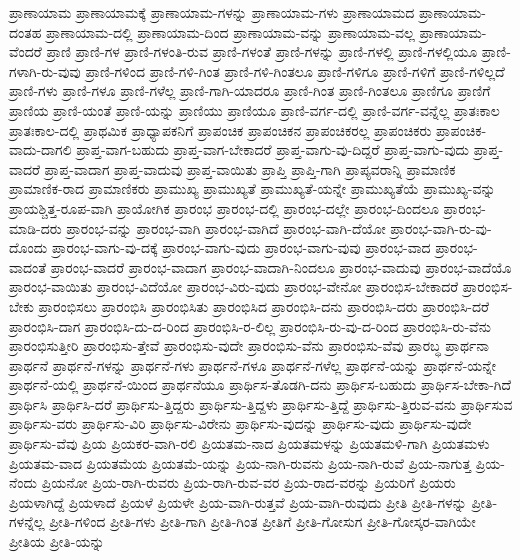 {ಪ್ರಾಣಾಯಾಮ
ಪ್ರಾಣಾಯಾಮಕ್ಕೆ
ಪ್ರಾಣಾಯಾಮ-ಗಳನ್ನು
ಪ್ರಾಣಾಯಾಮ-ಗಳು
ಪ್ರಾಣಾಯಾಮದ
ಪ್ರಾಣಾಯಾಮ-ದಂತಹ
ಪ್ರಾಣಾಯಾಮ-ದಲ್ಲಿ
ಪ್ರಾಣಾಯಾಮ-ದಿಂದ
ಪ್ರಾಣಾಯಾಮ-ವನ್ನು
ಪ್ರಾಣಾಯಾಮ-ವಲ್ಲ
ಪ್ರಾಣಾಯಾಮ-ವೆಂದರೆ
ಪ್ರಾಣಿ
ಪ್ರಾಣಿ-ಗಳ
ಪ್ರಾಣಿ-ಗಳಂತಿ-ರುವ
ಪ್ರಾಣಿ-ಗಳಂತೆ
ಪ್ರಾಣಿ-ಗಳನ್ನು
ಪ್ರಾಣಿ-ಗಳಲ್ಲಿ
ಪ್ರಾಣಿ-ಗಳಲ್ಲಿಯೂ
ಪ್ರಾಣಿ-ಗಳಾಗಿ-ರು-ವುವು
ಪ್ರಾಣಿ-ಗಳಿಂದ
ಪ್ರಾಣಿ-ಗಳಿ-ಗಿಂತ
ಪ್ರಾಣಿ-ಗಳಿ-ಗಿಂತಲೂ
ಪ್ರಾಣಿ-ಗಳಿಗೂ
ಪ್ರಾಣಿ-ಗಳಿಗೆ
ಪ್ರಾಣಿ-ಗಳಿಲ್ಲದೆ
ಪ್ರಾಣಿ-ಗಳು
ಪ್ರಾಣಿ-ಗಳೂ
ಪ್ರಾಣಿ-ಗಳೆಲ್ಲ
ಪ್ರಾಣಿ-ಗಾಗಿ-ಯಾದರೂ
ಪ್ರಾಣಿ-ಗಿಂತ
ಪ್ರಾಣಿ-ಗಿಂತಲೂ
ಪ್ರಾಣಿಗೂ
ಪ್ರಾಣಿಗೆ
ಪ್ರಾಣಿಯ
ಪ್ರಾಣಿ-ಯಂತೆ
ಪ್ರಾಣಿ-ಯನ್ನು
ಪ್ರಾಣಿಯು
ಪ್ರಾಣಿಯೂ
ಪ್ರಾಣಿ-ವರ್ಗ-ದಲ್ಲಿ
ಪ್ರಾಣಿ-ವರ್ಗ-ವನ್ನೆಲ್ಲ
ಪ್ರಾತಃಕಾಲ
ಪ್ರಾತಃಕಾಲ-ದಲ್ಲಿ
ಪ್ರಾಥಮಿಕ
ಪ್ರಾಧ್ಯಾಪಕನಿಗೆ
ಪ್ರಾಪಂಚಿಕ
ಪ್ರಾಪಂಚಿಕನ
ಪ್ರಾಪಂಚಿಕರಲ್ಲ
ಪ್ರಾಪಂಚಿಕರು
ಪ್ರಾಪಂಚಿಕ-ವಾದು-ದಾಗಲಿ
ಪ್ರಾಪ್ತ-ವಾಗ-ಬಹುದು
ಪ್ರಾಪ್ತ-ವಾಗ-ಬೇಕಾದರೆ
ಪ್ರಾಪ್ತ-ವಾಗು-ವು-ದಿದ್ದರೆ
ಪ್ರಾಪ್ತ-ವಾಗು-ವುದು
ಪ್ರಾಪ್ತ-ವಾದರೆ
ಪ್ರಾಪ್ತ-ವಾದಾಗ
ಪ್ರಾಪ್ತ-ವಾದುವು
ಪ್ರಾಪ್ತ-ವಾಯಿತು
ಪ್ರಾಪ್ತಿ
ಪ್ರಾಪ್ತಿ-ಗಾಗಿ
ಪ್ರಾಪ್ಯವರಾನ್ನಿ
ಪ್ರಾಮಾಣಿಕ
ಪ್ರಾಮಾಣಿಕ-ರಾದ
ಪ್ರಾಮಾಣಿಕರು
ಪ್ರಾಮುಖ್ಯ
ಪ್ರಾಮುಖ್ಯತೆ
ಪ್ರಾಮುಖ್ಯತೆ-ಯನ್ನೇ
ಪ್ರಾಮುಖ್ಯತೆಯೆ
ಪ್ರಾಮುಖ್ಯ-ವನ್ನು
ಪ್ರಾಯಶ್ಚಿತ್ತ-ರೂಪ-ವಾಗಿ
ಪ್ರಾಯೋಗಿಕ
ಪ್ರಾರಂಭ
ಪ್ರಾರಂಭ-ದಲ್ಲಿ
ಪ್ರಾರಂಭ-ದಲ್ಲೇ
ಪ್ರಾರಂಭ-ದಿಂದಲೂ
ಪ್ರಾರಂಭ-ಮಾಡಿ-ದರು
ಪ್ರಾರಂಭ-ವನ್ನು
ಪ್ರಾರಂಭ-ವಾಗಿ
ಪ್ರಾರಂಭ-ವಾಗಿದೆ
ಪ್ರಾರಂಭ-ವಾಗಿ-ದೆಯೋ
ಪ್ರಾರಂಭ-ವಾಗಿ-ರು-ವು-ದೊಂದು
ಪ್ರಾರಂಭ-ವಾಗು-ವು-ದಕ್ಕೆ
ಪ್ರಾರಂಭ-ವಾಗು-ವುದು
ಪ್ರಾರಂಭ-ವಾಗು-ವುವು
ಪ್ರಾರಂಭ-ವಾದ
ಪ್ರಾರಂಭ-ವಾದಂತೆ
ಪ್ರಾರಂಭ-ವಾದರೆ
ಪ್ರಾರಂಭ-ವಾದಾಗ
ಪ್ರಾರಂಭ-ವಾದಾಗಿ-ನಿಂದಲೂ
ಪ್ರಾರಂಭ-ವಾದುವು
ಪ್ರಾರಂಭ-ವಾದೆಯೊ
ಪ್ರಾರಂಭ-ವಾಯಿತು
ಪ್ರಾರಂಭ-ವಿದೆಯೋ
ಪ್ರಾರಂಭ-ವಿರು-ವುದು
ಪ್ರಾರಂಭ-ವೇನೋ
ಪ್ರಾರಂಭಿಸ-ಬೇಕಾದರೆ
ಪ್ರಾರಂಭಿಸ-ಬೇಕು
ಪ್ರಾರಂಭಿಸಲು
ಪ್ರಾರಂಭಿಸಿ
ಪ್ರಾರಂಭಿಸಿತು
ಪ್ರಾರಂಭಿಸಿದ
ಪ್ರಾರಂಭಿಸಿ-ದನು
ಪ್ರಾರಂಭಿಸಿ-ದರು
ಪ್ರಾರಂಭಿಸಿ-ದರೆ
ಪ್ರಾರಂಭಿಸಿ-ದಾಗ
ಪ್ರಾರಂಭಿಸಿ-ದು-ದ-ರಿಂದ
ಪ್ರಾರಂಭಿಸಿ-ರ-ಲಿಲ್ಲ
ಪ್ರಾರಂಭಿಸಿ-ರು-ವು-ದ-ರಿಂದ
ಪ್ರಾರಂಭಿಸಿ-ರು-ವೆನು
ಪ್ರಾರಂಭಿಸುತ್ತೀರಿ
ಪ್ರಾರಂಭಿಸು-ತ್ತೇವೆ
ಪ್ರಾರಂಭಿಸು-ವುದೇ
ಪ್ರಾರಂಭಿಸು-ವೆನು
ಪ್ರಾರಂಭಿಸು-ವೆವು
ಪ್ರಾರಬ್ಧ
ಪ್ರಾರ್ಥನಾ
ಪ್ರಾರ್ಥನೆ
ಪ್ರಾರ್ಥನೆ-ಗಳನ್ನು
ಪ್ರಾರ್ಥನೆ-ಗಳು
ಪ್ರಾರ್ಥನೆ-ಗಳೂ
ಪ್ರಾರ್ಥನೆ-ಗಳೆಲ್ಲ
ಪ್ರಾರ್ಥನೆ-ಯನ್ನು
ಪ್ರಾರ್ಥನೆ-ಯನ್ನೇ
ಪ್ರಾರ್ಥನೆ-ಯಲ್ಲಿ
ಪ್ರಾರ್ಥನೆ-ಯಿಂದ
ಪ್ರಾರ್ಥನೆಯೂ
ಪ್ರಾರ್ಥಿಸ-ತೊಡಗಿ-ದನು
ಪ್ರಾರ್ಥಿಸ-ಬಹುದು
ಪ್ರಾರ್ಥಿಸ-ಬೇಕಾ-ಗಿದೆ
ಪ್ರಾರ್ಥಿಸಿ
ಪ್ರಾರ್ಥಿಸಿ-ದರೆ
ಪ್ರಾರ್ಥಿಸು-ತ್ತಿದ್ದರು
ಪ್ರಾರ್ಥಿಸು-ತ್ತಿದ್ದಳು
ಪ್ರಾರ್ಥಿಸು-ತ್ತಿದ್ದೆ
ಪ್ರಾರ್ಥಿಸು-ತ್ತಿರುವ-ವನು
ಪ್ರಾರ್ಥಿಸುವ
ಪ್ರಾರ್ಥಿಸು-ವರು
ಪ್ರಾರ್ಥಿಸು-ವಿರಿ
ಪ್ರಾರ್ಥಿಸು-ವಿರೇನು
ಪ್ರಾರ್ಥಿಸು-ವುದನ್ನು
ಪ್ರಾರ್ಥಿಸು-ವುದು
ಪ್ರಾರ್ಥಿಸು-ವುದೇ
ಪ್ರಾರ್ಥಿಸು-ವೆವು
ಪ್ರಿಯ
ಪ್ರಿಯಕರ-ವಾಗಿ-ರಲಿ
ಪ್ರಿಯತಮ-ನಾದ
ಪ್ರಿಯತಮಳನ್ನು
ಪ್ರಿಯತಮಳಿ-ಗಾಗಿ
ಪ್ರಿಯತಮಳು
ಪ್ರಿಯತಮ-ವಾದ
ಪ್ರಿಯತಮೆಯ
ಪ್ರಿಯತಮೆ-ಯನ್ನು
ಪ್ರಿಯ-ನಾಗಿ-ರುವನು
ಪ್ರಿಯ-ನಾಗಿ-ರುವೆ
ಪ್ರಿಯ-ನಾಗುತ್ತ
ಪ್ರಿಯ-ನೆಂದು
ಪ್ರಿಯನೋ
ಪ್ರಿಯ-ರಾಗಿ-ರುವರು
ಪ್ರಿಯ-ರಾಗಿ-ರುವ-ವರ
ಪ್ರಿಯ-ರಾದ-ವರನ್ನು
ಪ್ರಿಯರಿಗೆ
ಪ್ರಿಯರು
ಪ್ರಿಯಳಾಗಿದ್ದೆ
ಪ್ರಿಯಳಾದೆ
ಪ್ರಿಯಳೆ
ಪ್ರಿಯಳೇ
ಪ್ರಿಯ-ವಾಗಿ-ರುತ್ತವೆ
ಪ್ರಿಯ-ವಾಗಿ-ರುವುದು
ಪ್ರೀತಿ
ಪ್ರೀತಿ-ಗಳನ್ನು
ಪ್ರೀತಿ-ಗಳನ್ನೆಲ್ಲ
ಪ್ರೀತಿ-ಗಳಿಂದ
ಪ್ರೀತಿ-ಗಳು
ಪ್ರೀತಿ-ಗಾಗಿ
ಪ್ರೀತಿ-ಗಿಂತ
ಪ್ರೀತಿಗೆ
ಪ್ರೀತಿ-ಗೋಸುಗ
ಪ್ರೀತಿ-ಗೋಸ್ಕರ-ವಾಗಿಯೇ
ಪ್ರೀತಿಯ
ಪ್ರೀತಿ-ಯನ್ನು
}
